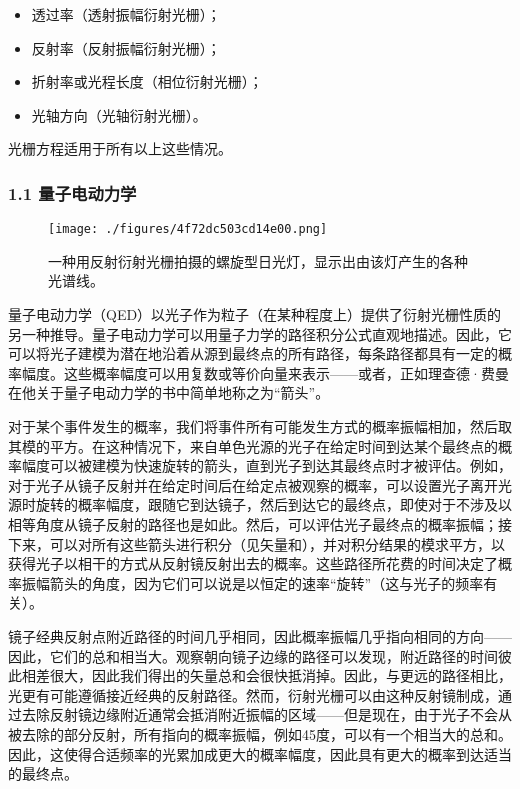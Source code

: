 \begin{itemize}
\item 透过率（透射振幅衍射光栅）；
\item 反射率（反射振幅衍射光栅）；
\item 折射率或光程长度（相位衍射光栅）；
\item 光轴方向（光轴衍射光栅）。
\end{itemize}

光栅方程适用于所有以上这些情况。

\subsubsection{1.1 量子电动力学}
\begin{figure}[ht]
\centering
\texttt{[image: ./figures/4f72dc503cd14e00.png]}
\caption{一种用反射衍射光栅拍摄的螺旋型日光灯，显示出由该灯产生的各种光谱线。} \label{fig_YSGS_4}
\end{figure}
量子电动力学（QED）以光子作为粒子（在某种程度上）提供了衍射光栅性质的另一种推导。量子电动力学可以用量子力学的路径积分公式直观地描述。因此，它可以将光子建模为潜在地沿着从源到最终点的所有路径，每条路径都具有一定的概率幅度。这些概率幅度可以用复数或等价向量来表示——或者，正如理查德·费曼在他关于量子电动力学的书中简单地称之为“箭头”。

对于某个事件发生的概率，我们将事件所有可能发生方式的概率振幅相加，然后取其模的平方。在这种情况下，来自单色光源的光子在给定时间到达某个最终点的概率幅度可以被建模为快速旋转的箭头，直到光子到达其最终点时才被评估。例如，对于光子从镜子反射并在给定时间后在给定点被观察的概率，可以设置光子离开光源时旋转的概率幅度，跟随它到达镜子，然后到达它的最终点，即使对于不涉及以相等角度从镜子反射的路径也是如此。然后，可以评估光子最终点的概率振幅；接下来，可以对所有这些箭头进行积分（见矢量和），并对积分结果的模求平方，以获得光子以相干的方式从反射镜反射出去的概率。这些路径所花费的时间决定了概率振幅箭头的角度，因为它们可以说是以恒定的速率“旋转”（这与光子的频率有关）。

镜子经典反射点附近路径的时间几乎相同，因此概率振幅几乎指向相同的方向——因此，它们的总和相当大。观察朝向镜子边缘的路径可以发现，附近路径的时间彼此相差很大，因此我们得出的矢量总和会很快抵消掉。因此，与更远的路径相比，光更有可能遵循接近经典的反射路径。然而，衍射光栅可以由这种反射镜制成，通过去除反射镜边缘附近通常会抵消附近振幅的区域——但是现在，由于光子不会从被去除的部分反射，所有指向的概率振幅，例如45度，可以有一个相当大的总和。因此，这使得合适频率的光累加成更大的概率幅度，因此具有更大的概率到达适当的最终点。

